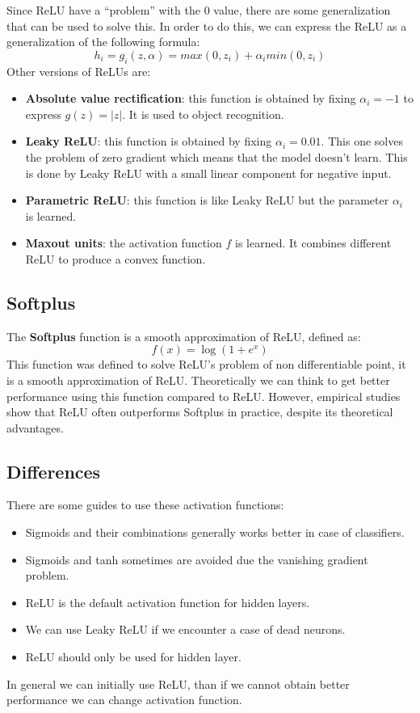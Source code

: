 Since ReLU have a ``problem'' with the $0$ value, there are some generalization
that can be used to solve this. In order to do this, we can express the ReLU as
a generalization of the following formula:
\begin{equation}
    h_i = g_i(z,\alpha) = max(0,z_i) + \alpha_i min(0, z_i)
\end{equation}
Other versions of ReLUs are:
\begin{itemize}
    \item \textbf{Absolute value rectification}: this function is obtained by
          fixing $\alpha_i = -1$ to express $g(z) = |z|$. It is used to object
          recognition.
    \item \textbf{Leaky ReLU}: this function is obtained by fixing $\alpha_i = 0.01$.
          This one solves the problem of zero gradient which means that the model
          doesn't learn. This is done by Leaky ReLU with a small linear component
          for negative input.
    \item \textbf{Parametric ReLU}: this function is like Leaky ReLU but the
          parameter $\alpha_i$ is learned.
    \item \textbf{Maxout units}: the activation function $f$ is learned. It
          combines different ReLU to produce a convex function.
\end{itemize}
\subsection{Softplus}
The \textbf{Softplus} function is a smooth approximation of ReLU, defined as:
\begin{equation}
    f(x) = \log(1+e^x)
\end{equation}
This function was defined to solve ReLU's problem of non differentiable point,
it is a smooth approximation of ReLU. Theoretically we can think to get better
performance using this function compared to ReLU. However, empirical studies show
that ReLU often outperforms Softplus in practice, despite its theoretical advantages.
\subsection{Differences}
There are some guides to use these activation functions:
\begin{itemize}
    \item Sigmoids and their combinations generally works better in case of classifiers.
    \item Sigmoids and tanh sometimes are avoided due the vanishing gradient problem.
    \item ReLU is the default activation function for hidden layers.
    \item We can use Leaky ReLU if we encounter a case of dead neurons.
    \item ReLU should only be used for hidden layer.
\end{itemize}
In general we can initially use ReLU, than if we cannot obtain better performance
we can change activation function.
